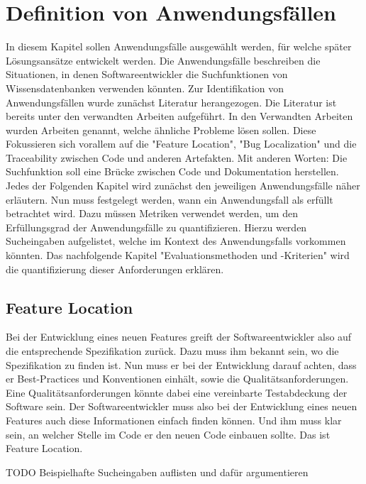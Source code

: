 \chapter{Definition von Anwendungsfällen}
In diesem Kapitel sollen Anwendungsfälle ausgewählt werden, für welche später Lösungsansätze entwickelt werden.
Die Anwendungsfälle beschreiben die Situationen, in denen Softwareentwickler die Suchfunktionen von Wissensdatenbanken verwenden könnten.
Zur Identifikation von Anwendungsfällen wurde zunächst Literatur herangezogen.
Die Literatur ist bereits unter den verwandten Arbeiten aufgeführt.
In den Verwandten Arbeiten wurden Arbeiten genannt, welche ähnliche Probleme lösen sollen.
Diese Fokussieren sich vorallem auf die "Feature Location", "Bug Localization" und die Traceability zwischen Code und anderen Artefakten.
Mit anderen Worten: Die Suchfunktion soll eine Brücke zwischen Code und Dokumentation herstellen.\\

Jedes der Folgenden Kapitel wird zunächst den jeweiligen Anwendungsfälle näher erläutern.
Nun muss festgelegt werden, wann ein Anwendungsfall als erfüllt betrachtet wird.
Dazu müssen Metriken verwendet werden, um den Erfüllungsgrad der Anwendungsfälle zu quantifizieren.
Hierzu werden Sucheingaben aufgelistet, welche im Kontext des Anwendungsfalls vorkommen könnten.
Das nachfolgende Kapitel "Evaluationsmethoden und -Kriterien" wird die quantifizierung dieser Anforderungen erklären. 

\section{Feature Location}
Bei der Entwicklung eines neuen Features greift der Softwareentwickler also auf die entsprechende Spezifikation zurück.
Dazu muss ihm bekannt sein, wo die Spezifikation zu finden ist.
Nun muss er bei der Entwicklung darauf achten, dass er Best-Practices und Konventionen einhält, sowie die Qualitätsanforderungen.
Eine Qualitätsanforderungen könnte dabei eine vereinbarte Testabdeckung der Software sein.
Der Softwareentwickler muss also bei der Entwicklung eines neuen Features auch diese Informationen einfach finden können.
Und ihm muss klar sein, an welcher Stelle im Code er den neuen Code einbauen sollte.
Das ist Feature Location.

TODO Beispielhafte Sucheingaben auflisten und dafür argumentieren


